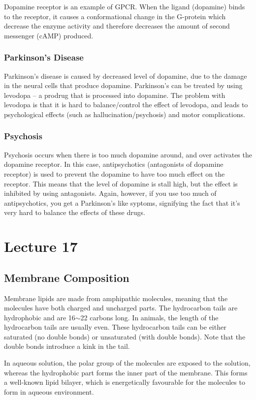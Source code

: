 \documentclass[a4paper, 12pt]{report}
\newcommand{\mychapter}[2]{
    \setcounter{chapter}{#1}
    \setcounter{section}{0}
    \chapter*{#2}
    \addcontentsline{toc}{chapter}{#2}
}
\begin{document}
Dopamine receptor is an example of GPCR.
When the ligand (dopamine) binds to the receptor, it causes a conformational change in the G-protein which decrease the enzyme activity and therefore decreases the amount of second messenger (cAMP) produced.

\subsection{Parkinson's Disease}

Parkinson's disease is caused by decreased level of dopamine, due to the damage in the neural cells that produce dopamine.
Parkinson's can be treated by using levodopa -- a prodrug that is processed into dopamine.
The problem with levodopa is that it is hard to balance/control the effect of levodopa, and leads to psychological effects (such as hallucination/psychosis) and motor complications.

\subsection{Psychosis}

Psychosis occurs when there is too much dopamine around, and over activates the dopamine receptor.
In this case, antipsychotics (antagonists of dopamine receptor) is used to prevent the dopamine to have too much effect on the receptor.
This means that the level of dopamine is stall high, but the effect is inhibited by using antagonists.
Again, however, if you use too much of antipsychotics, you get a Parkinson's like syptoms, signifying the fact that it's very hard to balance the effects of these drugs.

\mychapter{17}{Lecture 17}

\section{Membrane Composition}

Membrane lipids are made from amphipathic molecules, meaning that the molecules have both charged and uncharged parts.
The hydrocarbon tails are hydrophobic and are 16$\sim$22 carbons long.
In animals, the length of the hydrocarbon tails are usually even.
These hydrocarbon tails can be either saturated (no double bonds) or unsaturated (with double bonds).
Note that the double bonds introduce a kink in the tail.

In aqueous solution, the polar group of the molecules are exposed to the solution, whereas the hydrophobic part forms the inner part of the membrane.
This forms a well-known lipid bilayer, which is energetically favourable for the molecules to form in aqueous environment.
\end{document}
